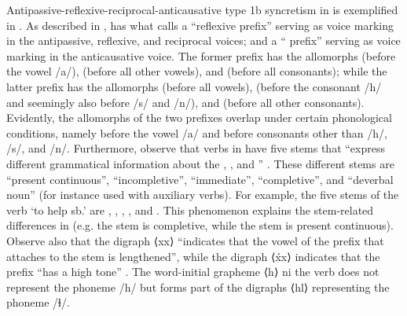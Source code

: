 Antipassive-reflexive-reciprocal-anticausative type 1b syncretism in  is exemplified in . As described in ,  has what \cite[343, 347]{montgomery-anderson:2008} calls a “reflexive prefix”  serving as voice marking in the antipassive, reflexive, and reciprocal voices; and a “ prefix”  serving as voice marking in the anticausative voice. The former prefix has the allomorphs  (before the vowel /a/),  (before all other vowels), and  (before all consonants); while the latter prefix has the allomorphs  (before all vowels),  (before the consonant /h/ and seemingly also before /s/ and /n/), and  (before all other consonants). Evidently, the allomorphs of the two prefixes overlap under certain phonological conditions, namely before the vowel /a/ and before consonants other than /h/, /s/, and /n/. Furthermore, observe that verbs in  have five stems that “express different grammatical information about the , , and ” \citep[252]{montgomery-anderson:2008}. These different stems are “present continuous”, “incompletive”, “immediate”, “completive”, and “deverbal noun” (for instance used with auxiliary verbs). For example, the five stems of the verb ‘to help sb.’ are , , , , and  \citep[224f.]{montgomery-anderson:2008}. This phenomenon explains the stem-related differences in  (e.g. the stem  is completive, while the stem  is present continuous). Observe also that the digraph ⟨xx⟩ “indicates that the vowel of the prefix that attaches to the stem is lengthened”, while the digraph ⟨x́x⟩ indicates that the prefix “has a high tone” \citep[xii]{montgomery-anderson:2008}. The word-initial grapheme ⟨h⟩ ni the verb   does not represent the phoneme /h/ but forms part of the digraphs ⟨hl⟩ representing the phoneme /ɬ/.

